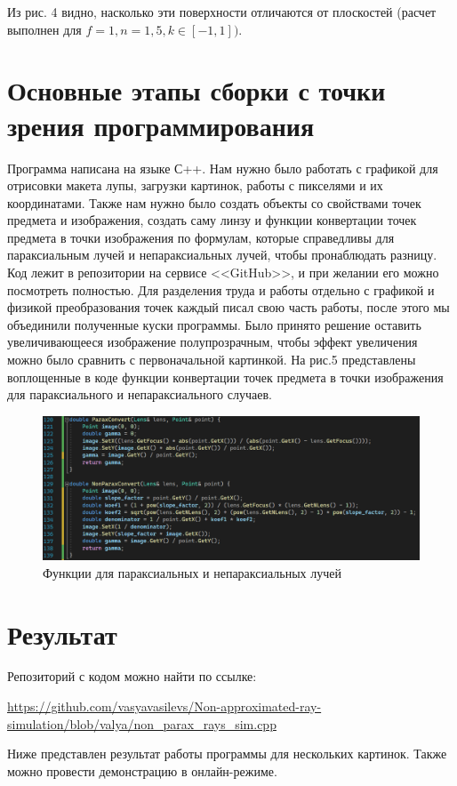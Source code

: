 \documentclass[a4paper,12pt]{article} %
\begin{document}
Из рис. 4 видно, насколько эти поверхности отличаются от плоскостей (расчет выполнен для $f=1, n=1,5, k \in[-1,1])$.
\newpage
\section{Основные этапы сборки с точки зрения программирования}
Программа написана на языке С++. Нам нужно было работать с графикой для отрисовки макета лупы, загрузки картинок, работы с пикселями и их координатами. Также нам нужно было создать объекты со свойствами точек предмета и изображения, создать саму линзу и функции конвертации точек предмета в точки изображения по формулам, которые справедливы для параксиальным лучей и непараксиальных лучей, чтобы пронаблюдать разницу. Код лежит в репозитории на сервисе <<GitHub>>, и при желании его можно посмотреть полностью. Для разделения труда и работы отдельно с графикой и физикой преобразования точек каждый писал свою часть работы, после этого мы объединили полученные куски программы. Было принято решение оставить увеличивающееся изображение полупрозрачным, чтобы эффект увеличения можно было сравнить с первоначальной картинкой. На рис.5 представлены воплощенные в коде функции конвертации точек предмета в точки изображения для параксиального и непараксиального случаев.

\begin{figure}[h!]
	\centering
	\includegraphics[scale=0.8]{image_2022-05-30_15-53-46.png}
	\caption{Функции для параксиальных и непараксиальных лучей}
\end{figure}

\newpage
\section{Результат}
Репозиторий с кодом можно найти по ссылке:

\url{https://github.com/vasyavasilevs/Non-approximated-ray-simulation/blob/valya/non_parax_rays_sim.cpp}

Ниже представлен результат работы программы для нескольких картинок. Также можно провести демонстрацию в онлайн-режиме.
\end{document}
